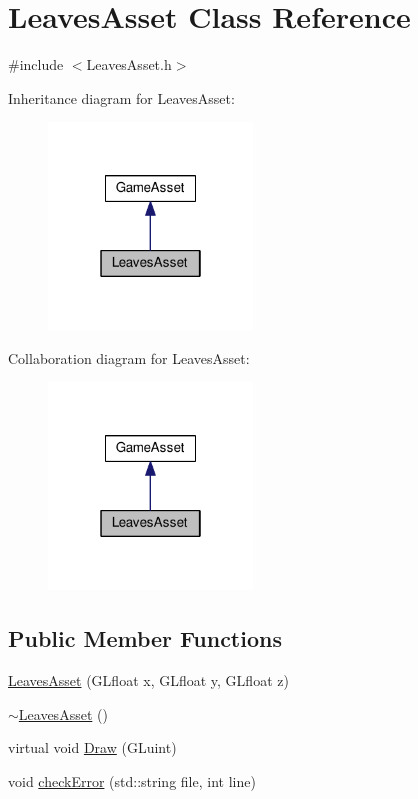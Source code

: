 \hypertarget{classLeavesAsset}{}\section{Leaves\+Asset Class Reference}
\label{classLeavesAsset}


{\ttfamily \#include $<$Leaves\+Asset.\+h$>$}



Inheritance diagram for Leaves\+Asset\+:\nopagebreak
\begin{figure}[H]
\begin{center}
\leavevmode
\includegraphics[width=154pt]{classLeavesAsset__inherit__graph}
\end{center}
\end{figure}


Collaboration diagram for Leaves\+Asset\+:\nopagebreak
\begin{figure}[H]
\begin{center}
\leavevmode
\includegraphics[width=154pt]{classLeavesAsset__coll__graph}
\end{center}
\end{figure}
\subsection*{Public Member Functions}
\begin{DoxyCompactItemize}
\item 
\hyperlink{classLeavesAsset_a1fb1212e5399f16071f0be7ff42cc344}{Leaves\+Asset} (G\+Lfloat x, G\+Lfloat y, G\+Lfloat z)
\item 
\hyperlink{classLeavesAsset_ae98d43a307f4c75cc8a661f0b36a213a}{$\sim$\+Leaves\+Asset} ()
\item 
virtual void \hyperlink{classLeavesAsset_a807fd196b83e5adb131d489ef6645742}{Draw} (G\+Luint)
\item 
void \hyperlink{classLeavesAsset_aa5ac41c76e9ed66570891ccf00b9c63a}{check\+Error} (std\+::string file, int line)
\end{DoxyCompactItemize}


